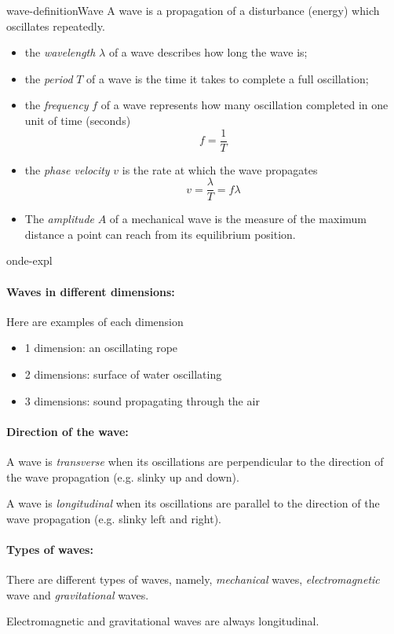 \documentclass[preview]{standalone}
\begin{document}
\genpage

\begin{snippetdefinition}{wave-definition}{Wave}
    A wave is a propagation of a disturbance (energy) which oscillates
    repeatedly.
    \begin{itemize}
        \item the \textit{wavelength} \(\lambda\) of a wave describes how long the wave is;
        \item the \textit{period} \(T\) of a wave is the time it takes to complete
            a full oscillation;
        \item the \textit{frequency} \(f\) of a wave represents how many oscillation
        completed in one unit of time (seconds)
        \[
            f = \frac{1}{T}
        \]
        \item the \textit{phase velocity} \(v\) is the rate at which
        the wave propagates
        \[
            v = \frac{\lambda}{T} = f\lambda
        \]
        \item The \textit{amplitude} \(A\) of a mechanical wave is the
        measure of the maximum distance a point can reach
        from its equilibrium position.
    \end{itemize} 
\end{snippetdefinition}

\begin{snippet}{onde-expl}
    \vspace{-0.6cm}
    \paragraph{Waves in different dimensions:}
    Here are examples of each dimension
    \begin{itemize}
        \item 1 dimension: an oscillating rope
        \item 2 dimensions: surface of water oscillating
        \item 3 dimensions: sound propagating through the air
    \end{itemize}

    \paragraph{Direction of the wave:}
    A wave is \textit{transverse} when its oscillations are perpendicular
    to the direction of the wave propagation (e.g. slinky up and down).

    A wave is \textit{longitudinal} when its oscillations are parallel
    to the direction of the wave propagation (e.g. slinky left and right).

    \paragraph{Types of waves:}
    There are different types of waves, namely,
    \textit{mechanical} waves, \textit{electromagnetic} wave
    and \textit{gravitational} waves.

    Electromagnetic and gravitational waves are always longitudinal.
\end{snippet}
\end{document}
